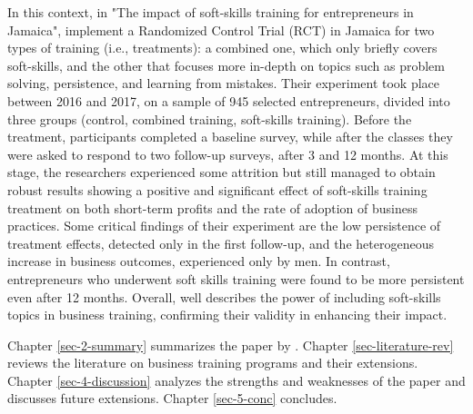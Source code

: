 In this context, in "The impact of soft-skills training for entrepreneurs in Jamaica", \cite{Ubfal2022} implement a Randomized Control Trial (RCT) in Jamaica for two types of training (i.e., treatments): a combined one, which only briefly covers soft-skills, and the other that focuses more in-depth on topics such as problem solving, persistence, and learning from mistakes. Their experiment took place between 2016 and 2017, on a sample of 945 selected entrepreneurs, divided into three groups (control, combined training, soft-skills training). Before the treatment, participants completed a baseline survey, while after the classes they were asked to respond to two follow-up surveys, after 3 and 12 months. At this stage, the researchers experienced some attrition but still managed to obtain robust results showing a positive and significant effect of soft-skills training treatment on both short-term profits and the rate of adoption of business practices. Some critical findings of their experiment are the low persistence of treatment effects, detected only in the first follow-up, and the heterogeneous increase in business outcomes, experienced only by men. In contrast, entrepreneurs who underwent soft skills training were found to be more persistent even after 12 months. Overall, \cite{Ubfal2022} well describes the power of including soft-skills topics in business training, confirming their validity in enhancing their impact.

Chapter \ref{sec-2-summary} summarizes the paper by \cite{Ubfal2022}. Chapter \ref{sec-literature-rev} reviews the literature on business training programs and their extensions. Chapter \ref{sec-4-discussion} analyzes the strengths and weaknesses of the paper and discusses future extensions. Chapter \ref{sec-5-conc} concludes.